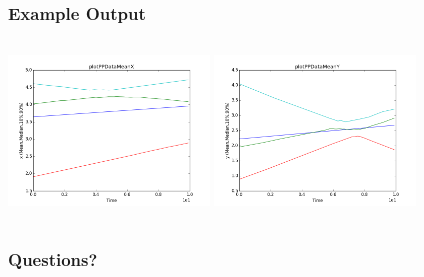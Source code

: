 \documentclass[t,9pt,svgnames]{beamer}
\begin{document}
\begin{frame}
  \frametitle{Example Output}
  \begin{columns}
    \includegraphics[height=4cm]{images/plotPPDataMeanX.png}
    \includegraphics[height=4cm]{images/plotPPDataMeanY.png}
  \end{columns}
\end{frame}

\begin{frame}
  \frametitle{Questions?}
\end{frame}
\end{document}
